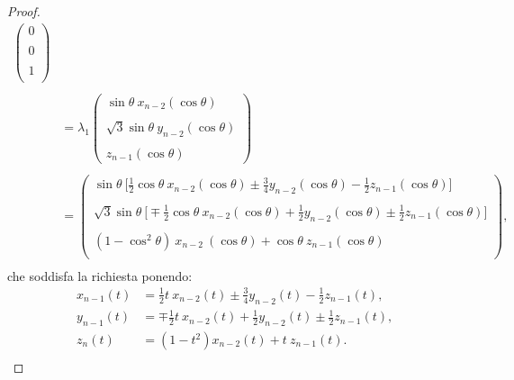 \documentclass[a4paper,oneside,11pt]{book}
\theoremstyle{definition} \newtheorem{Def}{Definizione}
\theoremstyle{plain} \newtheorem{teo}{Teorema}
\theoremstyle{plain} \newtheorem{cor}[teo]{Corollario}
\theoremstyle{definition} \newtheorem{lem}[teo]{Lemma}
\theoremstyle{plain} \newtheorem{pro}[teo]{Proposizione}
\begin{document}
\begin{proof}
\begin{equation*}
\begin{aligned}
\begin{pmatrix}
				0 \\ \\
				0 \\ \\

				1 \\
			\end{pmatrix}\\ \\
			&= \lambda_1 \begin{pmatrix}
				\sin \theta \ x_{n-2}(\cos \theta)\\ 	\\
				\sqrt{3} \sin \theta \ y_{n-2}(\cos \theta) \\ \\
				z_{n-1}(\cos \theta)
			\end{pmatrix}\\ \\
			&= \begin{pmatrix}
				\sin \theta\ \big[ \frac{1}{2} \cos \theta\ x_{n-2}(\cos \theta) \pm \frac{3}{4} y_{n-2}(\cos\theta)-\frac{1}{2} z_{n-1}(\cos\theta) \big]\\ \\
				\sqrt{3} \sin\theta\ \big[ \mp \frac{1}{2} \cos\theta\ x_{n-2}(\cos\theta) + \frac{1}{2} y_{n-2}(\cos\theta) \pm \frac{1}{2}z_{n-1}(\cos\theta)\big]\\ \\
				(1 - \cos^2 \theta)\ x_{n-2}\ (\cos\theta) + \cos\theta\ z_{n-1}(\cos\theta) \\
			\end{pmatrix} \text{,}\\
		\end{aligned}
		\end{equation*}
		che soddisfa la richiesta ponendo:
		\begin{equation*}
		\begin{aligned}
			x_{n-1}(t) &= \frac{1}{2}t \ x_{n-2}(t) \pm \frac{3}{4} y_{n-2}(t) - \frac{1}{2}z_{n-1}(t) \text{,}\\
			y_{n-1}(t) &= \mp \frac{1}{2}t\ x_{n-2}(t) + \frac{1}{2}y_{n-2}(t) \pm \frac{1}{2}z_{n-1}(t) \text{,}\\
			z_n(t) &= (1-t^2) x_{n-2}(t) + t \ z_{n-1}(t) \text{.}\\
		\end{aligned}
		\end{equation*}
		

\end{proof}
\end{document}
